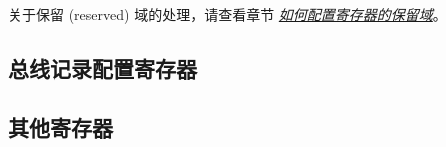 \documentclass[main\_\_CN.tex]{subfiles}
\begin{document}
关于保留 (reserved) 域的处理，请查看章节 \hyperref[programming-reserved-field]{\textit{如何配置寄存器的保留域}}。

\subsection{总线记录配置寄存器}
\label{sec:dbgassist-mem-monitor-reg}



\subsection{其他寄存器}
\label{sec:dbgassist-bus-monitor-reg}


\end{document}
